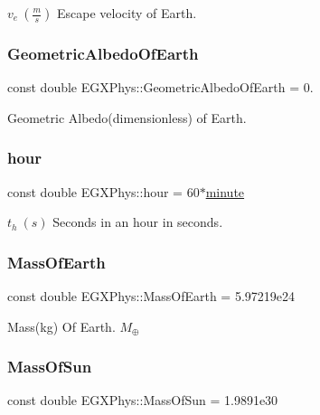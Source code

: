 $v_e\ (\frac{m}{s})$ Escape velocity of Earth. \mbox{\label{namespace_e_g_x_phys_aae01fb8ed365fc5de7acebeef34b7351}} 
\subsubsection{\texorpdfstring{Geometric\+Albedo\+Of\+Earth}{GeometricAlbedoOfEarth}}
{\footnotesize\ttfamily const double E\+G\+X\+Phys\+::\+Geometric\+Albedo\+Of\+Earth = 0.}

Geometric Albedo(dimensionless) of Earth. \mbox{\label{namespace_e_g_x_phys_a85c64ea70cddbb7e4c96adcc01cef6e2}} 
\subsubsection{\texorpdfstring{hour}{hour}}
{\footnotesize\ttfamily const double E\+G\+X\+Phys\+::hour = 60$\ast$\hyperlink{namespace_e_g_x_phys_ab3a72a63e9c502847d0db88a167dc02b}{minute}}

$t_{h}\ (s)$ Seconds in an hour in seconds. \mbox{\label{namespace_e_g_x_phys_ace4a9d8c0b21215536857f4c1087a4e8}} 
\subsubsection{\texorpdfstring{Mass\+Of\+Earth}{MassOfEarth}}
{\footnotesize\ttfamily const double E\+G\+X\+Phys\+::\+Mass\+Of\+Earth = 5.\+97219e24}

Mass(kg) Of Earth. $M_\oplus$ \mbox{\label{namespace_e_g_x_phys_a6e84ae13f1dbcecb215af787bbc12cd6}} 
\subsubsection{\texorpdfstring{Mass\+Of\+Sun}{MassOfSun}}
{\footnotesize\ttfamily const double E\+G\+X\+Phys\+::\+Mass\+Of\+Sun = 1.\+9891e30}

